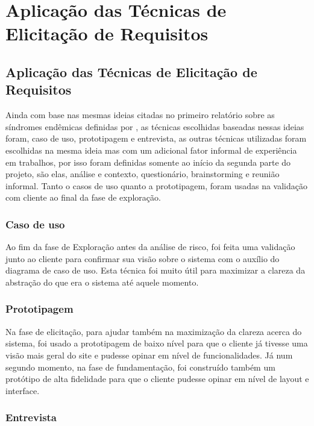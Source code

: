 \part{Aplicação das Técnicas de Elicitação de Requisitos}
\chapter[Aplicação das Técnicas de Elicitação de Requisitos]{Aplicação das Técnicas de Elicitação de Requisitos} \label{sec:tec}


Ainda com base nas mesmas ideias citadas no primeiro relatório sobre as síndromes endêmicas definidas por \cite{leffingwell2000managing}, as técnicas escolhidas baseadas nessas ideias foram, caso de uso, prototipagem e entrevista, as outras técnicas utilizadas foram escolhidas na mesma ideia mas com um adicional fator informal de experiência em trabalhos, por isso foram definidas somente ao início da segunda parte do projeto, são elas, análise e contexto, questionário, brainstorming e reunião informal.
Tanto o casos de uso quanto a prototipagem, foram usadas na validação com cliente ao final da fase de exploração. 

\section{Caso de uso}

Ao fim da fase de Exploração antes da análise de risco, foi feita uma validação junto ao cliente para confirmar sua visão sobre o sistema com o auxílio do diagrama de caso de uso. Esta técnica foi muito útil para maximizar a clareza da abstração do que era o sistema até aquele momento.

\section{Prototipagem}

Na fase de elicitação, para ajudar também na maximização da clareza acerca do sistema, foi usado a prototipagem de baixo nível para que o cliente já tivesse uma visão mais geral do site e pudesse opinar em nível de funcionalidades. Já num segundo momento, na fase de fundamentação, foi construído também um protótipo de alta fidelidade para que o cliente pudesse opinar em nível de layout e interface.

\section{Entrevista}

